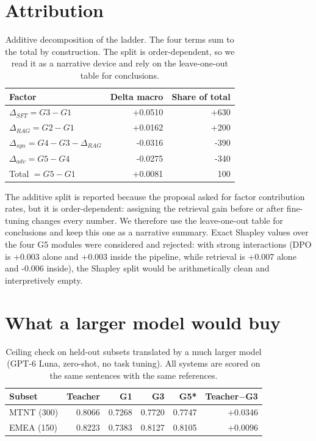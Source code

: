 \documentclass[a4paper,12pt,oneside]{article}
\begin{document}
\section{Attribution}

\begin{table}[htbp]
\centering
\small

\begin{tabular}{lrr}
\toprule
\textbf{Factor} & \textbf{Delta macro} & \textbf{Share of total} \\
\midrule
$\Delta_{SFT}=G3-G1$ & +0.0510 & +630 \\
$\Delta_{RAG}=G2-G1$ & +0.0162 & +200 \\
$\Delta_{syn}=G4-G3-\Delta_{RAG}$ & -0.0316 & -390 \\
$\Delta_{adv}=G5-G4$ & -0.0275 & -340 \\
Total $=G5-G1$ & +0.0081 & 100 \\
\bottomrule
\end{tabular}
\caption{Additive decomposition of the ladder. The four terms sum to the total by construction. The split is order-dependent, so we read it as a narrative device and rely on the leave-one-out table for conclusions.}
\end{table}

The additive split is reported because the proposal asked for factor contribution rates, but it
is order-dependent: assigning the retrieval gain before or after fine-tuning changes every
number. We therefore use the leave-one-out table for conclusions and keep this one as a
narrative summary. Exact Shapley values over the four G5 modules were considered and rejected:
with strong interactions (DPO is +0.003 alone and +0.003 inside the pipeline, while retrieval is
+0.007 alone and -0.006 inside), the Shapley split would be arithmetically clean and
interpretively empty.

\section{What a larger model would buy}

\begin{table}[htbp]
\centering
\small

\begin{tabular}{lrrrrr}
\toprule
\textbf{Subset} & \textbf{Teacher} & \textbf{G1} & \textbf{G3} & \textbf{G5*} & \textbf{Teacher$-$G3} \\
\midrule
MTNT (300) & 0.8066 & 0.7268 & 0.7720 & 0.7747 & +0.0346 \\
EMEA (150) & 0.8223 & 0.7383 & 0.8127 & 0.8105 & +0.0096 \\
\bottomrule
\end{tabular}
\caption{Ceiling check on held-out subsets translated by a much larger model (GPT-6 Luna, zero-shot, no task tuning). All systems are scored on the same sentences with the same references.}
\end{table}
\end{document}
